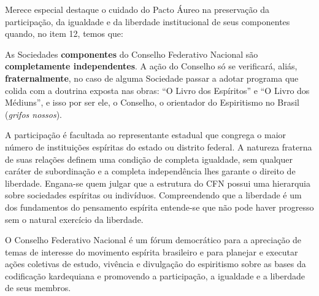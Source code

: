 Merece especial destaque o cuidado do Pacto Áureo na preservação da participação, da igualdade e da liberdade institucional de seus componentes quando, no item 12, temos que:


\begin{citacao}
As Sociedades \textbf{componentes} do Conselho Federativo Nacional são \textbf{completamente independentes}. A ação do Conselho só se verificará, aliás, \textbf{fraternalmente}, no caso de alguma Sociedade passar a adotar programa que colida com a doutrina exposta nas obras: “O Livro dos Espíritos” e “O Livro dos Médiuns”, e isso por ser ele, o Conselho, o orientador do Espiritismo no Brasil (\emph{grifos nossos}).
\end{citacao}

A participação é facultada ao representante estadual que congrega o maior número de instituições espíritas do estado ou distrito federal. A natureza fraterna de suas relações definem uma condição de completa igualdade, sem qualquer caráter de subordinação e a completa independência lhes garante o direito de liberdade. Engana-se quem julgar que a estrutura do CFN possui uma hierarquia sobre sociedades espíritas ou indivíduos. Compreendendo que a liberdade é um dos fundamentos do pensamento espírita entende-se que não pode haver progresso sem o natural exercício da liberdade.  

O Conselho Federativo Nacional é um fórum democrático para a apreciação de temas de interesse do movimento espírita brasileiro e para planejar e executar ações coletivas de estudo, vivência e divulgação do espiritismo sobre as bases da codificação kardequiana e promovendo a participação, a igualdade e a liberdade de seus membros. 

